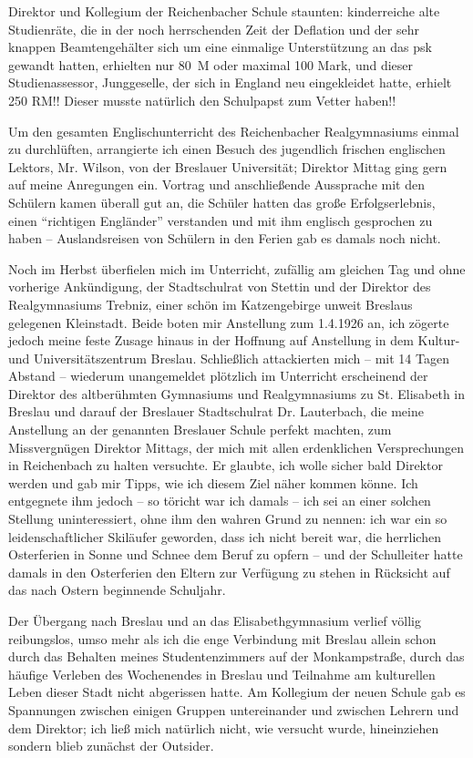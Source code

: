\documentclass[a5paper,pagesize,10pt,twoside=true]{scrbook}
\renewcommand{\marginpar}[2][]{}
\begin{document}
Direktor und Kollegium der Reichenbacher Schule staunten: kinderreiche alte Studienräte, die in der noch herrschenden Zeit der Deflation und der sehr knappen Beamtengehälter sich um eine einmalige Unterstützung an das \ac{psk} gewandt hatten, erhielten nur 80~M oder maximal 100 Mark, und dieser Studienassessor, Junggeselle, der sich in England neu eingekleidet hatte, erhielt 250 RM!! Dieser musste natürlich den Schulpapst zum Vetter haben!!

\marginpar{533}
Um den gesamten Englischunterricht des Reichenbacher Realgymnasiums einmal zu durchlüften, arrangierte ich einen Besuch des jugendlich frischen englischen Lektors, Mr. Wilson, von der Breslauer Universität; Direktor Mittag ging gern auf meine Anregungen ein. Vortrag und anschließende Aussprache mit den Schülern kamen überall gut an, die Schüler hatten das große Erfolgserlebnis, einen \enquote{richtigen Engländer} verstanden und mit ihm englisch gesprochen zu haben -- Auslandsreisen von Schülern in den Ferien gab es damals noch nicht.

Noch im Herbst überfielen mich im Unterricht, zufällig am gleichen Tag und ohne vorherige Ankündigung, der Stadtschulrat von Stettin und der Direktor des Realgymnasiums Trebniz, einer schön im Katzengebirge unweit Breslaus gelegenen Kleinstadt. Beide boten mir Anstellung zum 1.4.1926 an, ich zögerte jedoch meine feste Zusage hinaus in der Hoffnung auf Anstellung in dem Kultur- und Universitätszentrum Breslau. Schließlich attackierten mich -- mit 14 Tagen Abstand -- wiederum unangemeldet plötzlich im Unterricht erscheinend der Direktor des altberühmten Gymnasiums und Realgymnasiums zu St. Elisabeth in Breslau und darauf der Breslauer Stadtschulrat Dr. Lauterbach, die meine Anstellung an der genannten Breslauer Schule perfekt machten, zum Missvergnügen Direktor Mittags, der mich mit allen erdenklichen Versprechungen in Reichenbach zu halten versuchte. Er glaubte, ich wolle sicher bald Direktor werden und gab mir Tipps, wie ich diesem Ziel näher kommen könne. Ich entgegnete ihm jedoch -- so töricht war ich damals -- ich sei an einer solchen Stellung uninteressiert, ohne ihm den wahren Grund zu nennen: ich war ein so leidenschaftlicher Skiläufer geworden, dass ich nicht bereit war, die herrlichen Osterferien in Sonne und Schnee dem Beruf zu opfern -- und der Schulleiter hatte damals in den Osterferien den Eltern zur Verfügung zu stehen in Rücksicht auf das nach Ostern beginnende Schuljahr.

Der Übergang nach Breslau und an das Elisabethgymnasium verlief völlig reibungslos, umso mehr als ich die enge Verbindung mit Breslau allein schon durch das Behalten meines Studentenzimmers auf der Monkampstraße, durch das häufige Verleben des Wochenendes in Breslau und Teilnahme am kulturellen Leben dieser Stadt nicht abgerissen hatte. Am Kollegium der neuen Schule gab es Spannungen zwischen einigen Gruppen untereinander und zwischen Lehrern und dem Direktor; ich ließ mich natürlich nicht, wie versucht wurde, hineinziehen sondern blieb zunächst der Outsider.\\
\end{document}
